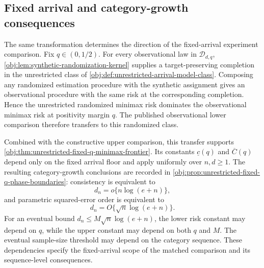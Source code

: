 \subsection{Fixed arrival and category-growth consequences}

The same transformation determines the direction of the fixed-arrival experiment comparison. Fix \(q\in(0,1/2)\). For every observational law in \(\mathcal D_{d,q}\), \cref{obj:lem:synthetic-randomization-kernel} supplies a target-preserving completion in the unrestricted class  of \cref{obj:def:unrestricted-arrival-model-class}. Composing any randomized estimation procedure with the synthetic assignment gives an observational procedure with the same risk at the corresponding completion. Hence the unrestricted randomized minimax risk  dominates the observational minimax risk at positivity margin \(q\). The published observational lower comparison therefore transfers to this randomized class.

Combined with the constructive upper comparison, this transfer supports \cref{obj:thm:unrestricted-fixed-q-minimax-frontier}. Its constants \(\underline c(q)\) and \(\overline C(q)\) depend only on the fixed arrival floor and apply uniformly over \(n,d\ge1\). The resulting category-growth conclusions are recorded in \cref{obj:prop:unrestricted-fixed-q-phase-boundaries}: consistency is equivalent to
\[
d_n=o\{n\log(e+n)\},
\]
and parametric squared-error order is equivalent to
\[
d_n=O\{\sqrt n\log(e+n)\}.
\]
For an eventual bound \(d_n\le M\sqrt n\log(e+n)\), the lower risk constant may depend on \(q\), while the upper constant may depend on both \(q\) and \(M\). The eventual sample-size threshold may depend on the category sequence. These dependencies specify the fixed-arrival scope of the matched comparison and its sequence-level consequences.
